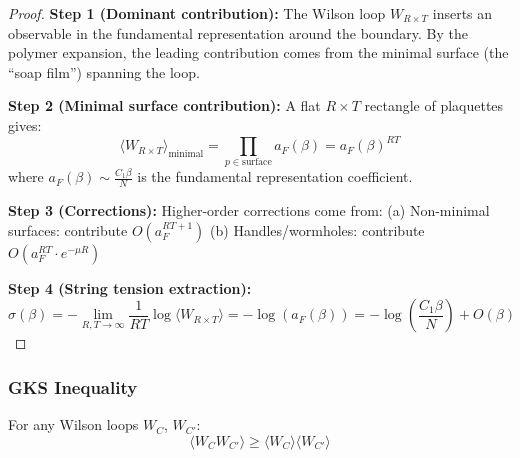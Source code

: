 \begin{proof}
\textbf{Step 1 (Dominant contribution):}
The Wilson loop $W_{R \times T}$ inserts an observable in the fundamental representation around the boundary. By the polymer expansion, the leading contribution comes from the minimal surface (the ``soap film'') spanning the loop.

\textbf{Step 2 (Minimal surface contribution):}
A flat $R \times T$ rectangle of plaquettes gives:
\begin{equation}
\langle W_{R \times T} \rangle_{\text{minimal}} = \prod_{p \in \text{surface}} a_F(\beta) = a_F(\beta)^{RT}
\end{equation}
where $a_F(\beta) \sim \frac{C_1 \beta}{N}$ is the fundamental representation coefficient.

\textbf{Step 3 (Corrections):}
Higher-order corrections come from:
(a) Non-minimal surfaces: contribute $O(a_F^{RT + 1})$
(b) Handles/wormholes: contribute $O(a_F^{RT} \cdot e^{-\mu R})$

\textbf{Step 4 (String tension extraction):}
\begin{equation}
\sigma(\beta) = -\lim_{R,T \to \infty} \frac{1}{RT} \log\langle W_{R \times T}\rangle = -\log(a_F(\beta)) = -\log\left(\frac{C_1\beta}{N}\right) + O(\beta)
\end{equation}
\end{proof}

\subsubsection{GKS Inequality}

\begin{theorem}
\label{thm:gks}
For any Wilson loops $W_C$, $W_{C'}$:
\begin{equation}
\langle W_C W_{C'} \rangle \geq \langle W_C \rangle \langle W_{C'} \rangle
\end{equation}
\end{theorem}

